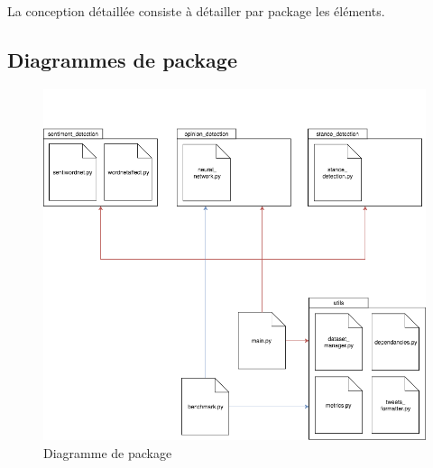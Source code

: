 \par La conception détaillée consiste à détailler par package les éléments.  \\

\subsection{Diagrammes de package}
\begin{figure}[h!]
	\centerline{\includegraphics[width=\textwidth]{img/diagramme_package.png}}
	\caption{Diagramme de package}
\end{figure}
